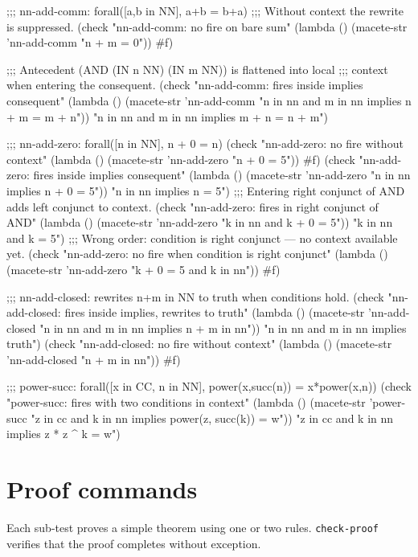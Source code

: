 \begin{VNBcode}
;;; nn-add-comm: forall([a,b in NN], a+b = b+a)
;;; Without context the rewrite is suppressed.
(check "nn-add-comm: no fire on bare sum"
       (lambda () (macete-str 'nn-add-comm "n + m = 0"))   #f)

;;; Antecedent (AND (IN n NN) (IN m NN)) is flattened into local
;;; context when entering the consequent.
(check "nn-add-comm: fires inside implies consequent"
       (lambda () (macete-str 'nn-add-comm
                              "n in nn and m in nn implies n + m = m + n"))
       "n in nn and m in nn implies m + n = n + m")

;;; nn-add-zero: forall([n in NN], n + 0 = n)
(check "nn-add-zero: no fire without context"
       (lambda () (macete-str 'nn-add-zero "n + 0 = 5"))   #f)
(check "nn-add-zero: fires inside implies consequent"
       (lambda () (macete-str 'nn-add-zero "n in nn implies n + 0 = 5"))
       "n in nn implies n = 5")
;;; Entering right conjunct of AND adds left conjunct to context.
(check "nn-add-zero: fires in right conjunct of AND"
       (lambda () (macete-str 'nn-add-zero "k in nn and k + 0 = 5"))
       "k in nn and k = 5")
;;; Wrong order: condition is right conjunct — no context available yet.
(check "nn-add-zero: no fire when condition is right conjunct"
       (lambda () (macete-str 'nn-add-zero "k + 0 = 5 and k in nn"))  #f)

;;; nn-add-closed: rewrites n+m in NN to truth when conditions hold.
(check "nn-add-closed: fires inside implies, rewrites to truth"
       (lambda () (macete-str 'nn-add-closed
                              "n in nn and m in nn implies n + m in nn"))
       "n in nn and m in nn implies truth")
(check "nn-add-closed: no fire without context"
       (lambda () (macete-str 'nn-add-closed "n + m in nn"))  #f)

;;; power-succ: forall([x in CC, n in NN], power(x,succ(n)) = x*power(x,n))
(check "power-succ: fires with two conditions in context"
       (lambda () (macete-str 'power-succ
                              "z in cc and k in nn implies power(z, succ(k)) = w"))
       "z in cc and k in nn implies z * z ^ k = w")
\end{VNBcode}

\section{Proof commands}

Each sub-test proves a simple theorem using one or two rules.
\texttt{check-proof} verifies that the proof completes without exception.

